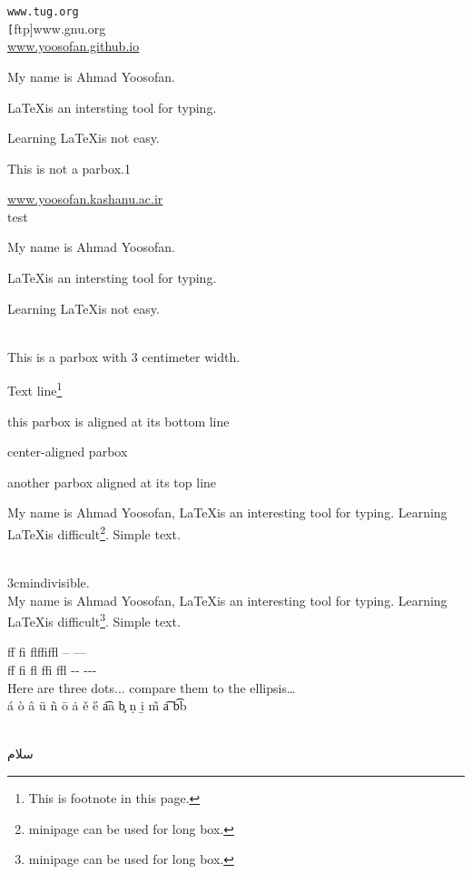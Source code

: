 \documentclass{article}
\newcommand{\site}[1]{\texttt{#1}} %
\begin{document}
\begin{latin}
\site{www.tug.org}\\
\site[ftp]{www.gnu.org}\\[2cm]
\url{www.yoosofan.github.io}
\parbox{1.5cm}{My name is Ahmad Yoosofan. }
\parbox{1.8cm}{\LaTeX  is an intersting tool for typing.} 
\parbox{1.6cm}{Learning \LaTeX is not easy.} 
This is not a parbox.1
\\ \par\noindent
\url{www.yoosofan.kashanu.ac.ir} \\
test
\quad\parbox[b]{1.8cm}{My name is Ahmad Yoosofan. }
\quad\parbox{1.8cm}{\LaTeX  is an intersting tool for typing.} 
\quad\parbox[t]{1.6cm}{Learning \LaTeX is not easy.} \\
This is a parbox with 3 centimeter width.
\\ \par\noindent
Text line\footnote{This is footnote in this page.}
\quad\parbox[b]{1.8cm}{this parbox is aligned at its bottom line}
\quad\parbox{1.5cm}{center-aligned parbox}
\quad\parbox[t]{2cm}{another parbox aligned at its top line}
\par\noindent
\begin{minipage}{3cm}
My name is Ahmad Yoosofan, \LaTeX is an interesting tool for typing. Learning \LaTeX is 
difficult\footnote{minipage can be used for long box.}. Simple text.
\end{minipage}\\
\mbox{3cm}{indivisible.\\My name is Ahmad Yoosofan, \LaTeX is an interesting tool for typing. Learning \LaTeX is difficult\footnote{minipage can be used for long box.}. Simple text.
} \par\noindent
ff fi flffiffl -- ---  \\
f\/f f\/i f\/l f\/f\/i f\/f\/l -\/- -\/-\/- \\
Here are three dots... compare them to the ellipsis\ldots \\
\'{a} \`{o} \^{a}  \"{u} \~{n}  \={o} \.{a} \v{e} \H{e} \t{aa} \c{b} \d{n}  \b{i} \~{m} \t{a} \t{bb} \\
\\
\end{latin}
سلام
\\
\end{document}
